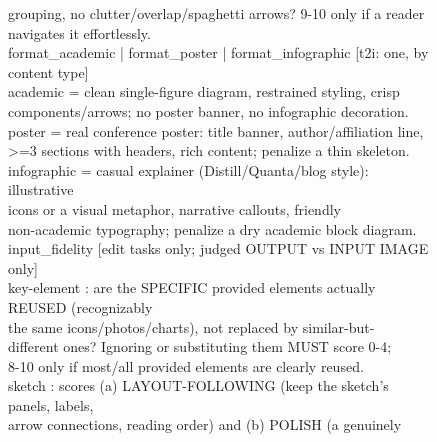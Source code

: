 \documentclass{article}
\begin{document}
\begin{figure}[t]
\begin{tcolorbox}
\hspace*{1.0em}grouping, no clutter/overlap/spaghetti arrows? 9-10 only if a reader \\
\hspace*{1.0em}navigates it effortlessly. \\[5pt]
format\_academic | format\_poster | format\_infographic   [t2i: one, by content type] \\
\hspace*{1.0em}academic    = clean single-figure diagram, restrained styling, crisp \\
\hspace*{8.0em}components/arrows; no poster banner, no infographic decoration. \\
\hspace*{1.0em}poster      = real conference poster: title banner, author/affiliation line, \\
\hspace*{8.0em}>=3 sections with headers, rich content; penalize a thin skeleton. \\
\hspace*{1.0em}infographic = casual explainer (Distill/Quanta/blog style): illustrative \\
\hspace*{8.0em}icons or a visual metaphor, narrative callouts, friendly \\
\hspace*{8.0em}non-academic typography; penalize a dry academic block diagram. \\[5pt]
input\_fidelity   [edit tasks only; judged OUTPUT vs INPUT IMAGE only] \\
\hspace*{1.0em}key-element : are the SPECIFIC provided elements actually REUSED (recognizably \\
\hspace*{8.0em}the same icons/photos/charts), not replaced by similar-but- \\
\hspace*{8.0em}different ones? Ignoring or substituting them MUST score 0-4; \\
\hspace*{8.0em}8-10 only if most/all provided elements are clearly reused. \\
\hspace*{1.0em}sketch      : scores (a) LAYOUT-FOLLOWING (keep the sketch's panels, labels, \\
\hspace*{8.0em}arrow connections, reading order) and (b) POLISH (a genuinely \\

\end{tcolorbox}
\end{figure}
\end{document}
